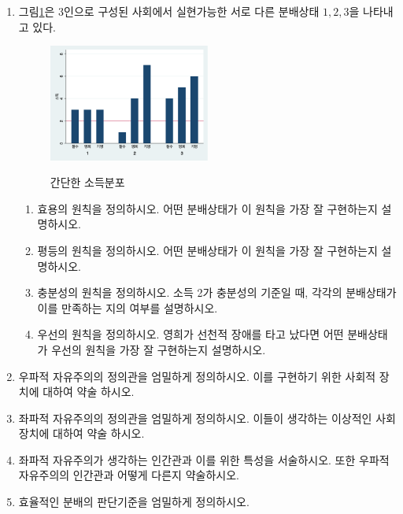 \documentclass{article}
\begin{document}
\begin{enumerate}[{\bf 문제 \arabic*.}]
    
    \item 그림\ref{simpled}은 3인으로 구성된 사회에서 실현가능한 서로 다른 분배상태 $1,2,3$을 나타내고 있다.
        \begin{figure}[htbp]
            \centering
            \caption{간단한 소득분포}
            \includegraphics[width=0.5\textwidth]{pic/simpledist.png}
            \label{simpled}
        \end{figure}
        \begin{enumerate}
            \item 효용의 원칙을 정의하시오. 어떤 분배상태가 이 원칙을 가장 잘 구현하는지 설명하시오.
            \item 평등의 원칙을 정의하시오. 어떤 분배상태가 이 원칙을 가장 잘 구현하는지 설명하시오.
            \item 충분성의 원칙을 정의하시오. 소득 2가 충분성의 기준일 때, 각각의 분배상태가 이를 만족하는 지의 여부를 설명하시오.
            \item 우선의 원칙을 정의하시오. 영희가 선천적 장애를 타고 났다면 어떤 분배상태가 우선의 원칙을 가장 잘 구현하는지 설명하시오.
        \end{enumerate}

    \item 우파적 자유주의의 정의관을 엄밀하게 정의하시오. 이를 구현하기 위한 사회적 장치에 대하여 약술 하시오.
    
    \item 좌파적 자유주의의 정의관을 엄밀하게 정의하시오. 이들이 생각하는 이상적인 사회장치에 대하여 약술 하시오.
    
    \item 좌파적 자유주의가 생각하는 인간관과 이를 위한 특성을 서술하시오. 또한 우파적 자유주의의 인간관과 어떻게 다른지 약술하시오.
    
\pagebreak
    
    \item 효율적인 분배의 판단기준을 엄밀하게 정의하시오.


\end{enumerate}
\end{document}
